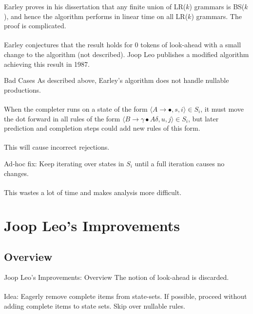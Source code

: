 \documentclass{beamer}
\begin{document}
\begin{frame}
  Earley proves in his dissertation that any finite union of LR($k$) grammars is BS($k$), and hence the algorithm performs in linear time on all LR($k$) grammars.
  The proof is complicated.\\~\\

  Earley conjectures that the result holds for $0$ tokens of look-ahead with a small change to the algorithm (not described). Joop Leo publishes
  a modified algorithm achieving this result in 1987.
\end{frame}

\begin{frame}{Bad Cases}
  As described above, Earley's algorithm does not handle nullable productions.\\~\\

  When the completer runs on a state of the form $\langle A \to \bullet, s, i\rangle \in S_i$, it must move the dot forward in
  all rules of the form $\langle B \to \gamma \bullet A \delta, u, j\rangle \in S_i$, but later prediction and completion steps
  could add new rules of this form.\\~\\

  This will cause incorrect rejections.
\end{frame}

\begin{frame}
  Ad-hoc fix: Keep iterating over states in $S_i$ until a full iteration causes no changes.\\~\\

  This wastes a lot of time and makes analysis more difficult.
\end{frame}

\section{Joop Leo's Improvements}

\subsection{Overview}
\begin{frame}{Joop Leo's Improvements: Overview}
  The notion of look-ahead is discarded.\\~\\

  Idea: Eagerly remove complete items from state-sets. If possible, proceed without adding complete items to state sets. Skip over nullable rules.
\end{frame}
\end{document}
